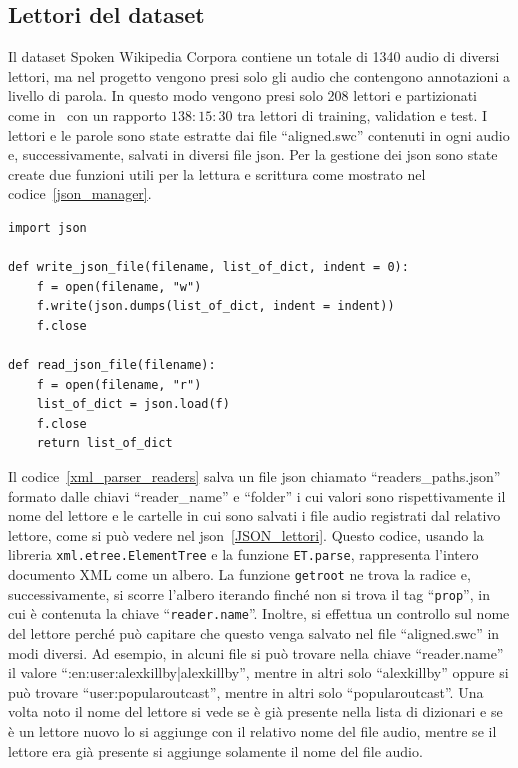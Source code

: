 \documentclass[12pt,a4paper,titlepage]{article}
\begin{document}
\subsection{Lettori del dataset}
\label{subsec:lettori}
Il dataset Spoken Wikipedia Corpora contiene un totale di 1340 audio di diversi lettori, ma nel progetto vengono presi solo gli audio che contengono annotazioni a livello di parola. In questo modo vengono presi solo 208 lettori e partizionati come in~\cite{salamon:Few-Shot} con un rapporto $138:15:30$ tra lettori di training, validation e test. I lettori e le parole sono state estratte dai file ``aligned.swc'' contenuti in ogni audio e, successivamente, salvati in diversi file json. Per la gestione dei json sono state create due funzioni utili per la lettura e scrittura come mostrato nel codice~\ref{json_manager}.
\begin{lstlisting}[language=iPython,firstnumber=1, caption=json\_manager.py, label=json_manager,captionpos=b]
import json
	
def write_json_file(filename, list_of_dict, indent = 0):
	f = open(filename, "w")
	f.write(json.dumps(list_of_dict, indent = indent))
	f.close
	
def read_json_file(filename):
	f = open(filename, "r")
	list_of_dict = json.load(f)
	f.close
	return list_of_dict
\end{lstlisting}

Il codice~\ref{xml_parser_readers} salva un file json chiamato ``readers\_paths.json'' formato dalle chiavi ``reader\_name'' e ``folder'' i cui valori sono rispettivamente il nome del lettore e le cartelle in cui sono salvati i file audio registrati dal relativo lettore, come si può vedere nel json~\ref{JSON_lettori}. Questo codice, usando la libreria \texttt{xml.etree.ElementTree} e la funzione \texttt{ET.parse}, rappresenta l'intero documento XML come un albero. La funzione \texttt{getroot} ne trova la radice e, successivamente, si scorre l'albero iterando finché non si trova il tag ``\texttt{prop}'', in cui è contenuta la chiave ``\texttt{reader.name}''. Inoltre, si effettua un controllo sul nome del lettore perché può capitare che questo venga salvato nel file ``aligned.swc'' in modi diversi. Ad esempio, in alcuni file si può trovare nella chiave ``reader.name'' il valore ``:en:user:alexkillby|alexkillby'', mentre in altri solo ``alexkillby'' oppure si può trovare ``user:popularoutcast'', mentre in altri solo ``popularoutcast''. Una volta noto il nome del lettore si vede se è già presente nella lista di dizionari e se è un lettore nuovo lo si aggiunge con il relativo nome del file audio, mentre se il lettore era già presente si aggiunge solamente il nome del file audio.
\end{document}
